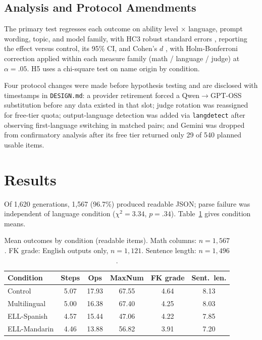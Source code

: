 \documentclass[runningheads]{llncs}
\begin{document}
\subsection{Analysis and Protocol Amendments}

The primary test regresses each outcome on ability level $\times$ language, prompt wording, topic, and model family, with HC3 robust standard errors \cite{mackinnon1985}, reporting the effect versus control, its 95\% CI, and Cohen's $d$ \cite{cohen1988}, with Holm-Bonferroni correction \cite{holm1979} applied within each measure family (math / language / judge) at $\alpha=.05$. H5 uses a chi-square test on name origin by condition.

Four protocol changes were made before hypothesis testing and are disclosed with timestamps in \texttt{DESIGN.md}: a provider retirement forced a Qwen$\to$GPT-OSS substitution before any data existed in that slot; judge rotation was reassigned for free-tier quota; output-language detection was added via \texttt{langdetect} \cite{nakatani2010} after observing first-language switching in matched pairs; and Gemini was dropped from confirmatory analysis after its free tier returned only 29 of 540 planned usable items.

\section{Results}

Of 1,620 generations, 1,567 (96.7\%) produced readable JSON; parse failure was independent of language condition ($\chi^2=3.34$, $p=.34$). Table~\ref{tab:descriptives} gives condition means.

\begin{table}[t]
\caption{Mean outcomes by condition (readable items). Math columns: $n=1{,}567$. FK grade: English outputs only, $n=1{,}121$. Sentence length: $n=1{,}496$.}
\label{tab:descriptives}
\centering\small
\begin{tabular}{lccccc}
\hline
Condition & Steps & Ops & MaxNum & FK grade & Sent.\ len.\\
\hline
Control & 5.07 & 17.93 & 67.55 & 4.64 & 8.13 \\
Multilingual & 5.00 & 16.38 & 67.40 & 4.25 & 8.03 \\
ELL-Spanish & 4.57 & 15.44 & 47.06 & 4.22 & 7.85 \\
ELL-Mandarin & 4.46 & 13.88 & 56.82 & 3.91 & 7.20 \\
\hline
\end{tabular}
\end{table}
\end{document}
